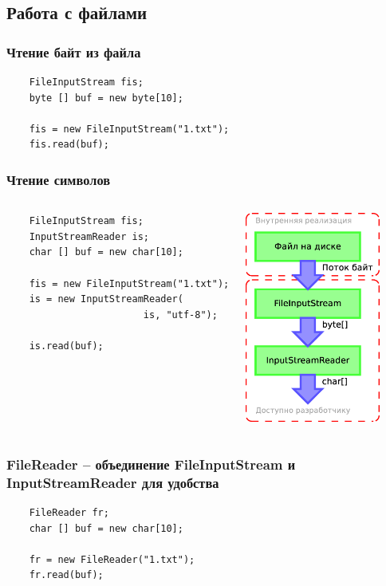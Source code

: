 \subsection{Работа с файлами}
\begin{frame}[fragile]
	\frametitle{Чтение байт из файла}

	\begin{Large}
	\begin{verbatim}
	FileInputStream fis;
	byte [] buf = new byte[10];

	fis = new FileInputStream("1.txt");
	fis.read(buf);
	\end{verbatim}
	\end{Large}
\end{frame}

\begin{frame}[fragile]
	\frametitle{Чтение символов}

	\begin{columns}[c]
	\column{2.8in}
	\begin{verbatim}
	FileInputStream fis;
	InputStreamReader is;
	char [] buf = new char[10];

	fis = new FileInputStream("1.txt");
	is = new InputStreamReader(
	                    is, "utf-8");

	is.read(buf);
	\end{verbatim}
	\column{1.7in}
	\includegraphics[width=1.75in]{lesson-3-Diagram1.eps}
	\end{columns}
\end{frame}

\begin{frame}[fragile]
	\frametitle{FileReader -- объединение FileInputStream и InputStreamReader для удобства}

	\begin{Large}
	
	\begin{verbatim}
	FileReader fr;
	char [] buf = new char[10];

	fr = new FileReader("1.txt");
	fr.read(buf);
	\end{verbatim}
	\end{Large}
\end{frame}


